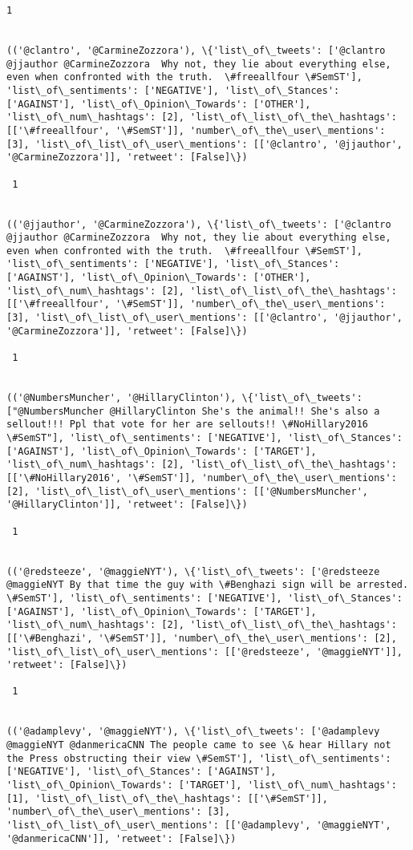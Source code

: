 \documentclass[11pt]{article}
\begin{document}
\begin{Verbatim}[commandchars=\\\{\}]
 1
 

(('@clantro', '@CarmineZozzora'), \{'list\_of\_tweets': ['@clantro @jjauthor @CarmineZozzora  Why not, they lie about everything else, even when confronted with the truth.  \#freeallfour \#SemST'], 'list\_of\_sentiments': ['NEGATIVE'], 'list\_of\_Stances': ['AGAINST'], 'list\_of\_Opinion\_Towards': ['OTHER'], 'list\_of\_num\_hashtags': [2], 'list\_of\_list\_of\_the\_hashtags': [['\#freeallfour', '\#SemST']], 'number\_of\_the\_user\_mentions': [3], 'list\_of\_list\_of\_user\_mentions': [['@clantro', '@jjauthor', '@CarmineZozzora']], 'retweet': [False]\})

 1
 

(('@jjauthor', '@CarmineZozzora'), \{'list\_of\_tweets': ['@clantro @jjauthor @CarmineZozzora  Why not, they lie about everything else, even when confronted with the truth.  \#freeallfour \#SemST'], 'list\_of\_sentiments': ['NEGATIVE'], 'list\_of\_Stances': ['AGAINST'], 'list\_of\_Opinion\_Towards': ['OTHER'], 'list\_of\_num\_hashtags': [2], 'list\_of\_list\_of\_the\_hashtags': [['\#freeallfour', '\#SemST']], 'number\_of\_the\_user\_mentions': [3], 'list\_of\_list\_of\_user\_mentions': [['@clantro', '@jjauthor', '@CarmineZozzora']], 'retweet': [False]\})

 1
 

(('@NumbersMuncher', '@HillaryClinton'), \{'list\_of\_tweets': ["@NumbersMuncher @HillaryClinton She's the animal!! She's also a sellout!!! Ppl that vote for her are sellouts!! \#NoHillary2016 \#SemST"], 'list\_of\_sentiments': ['NEGATIVE'], 'list\_of\_Stances': ['AGAINST'], 'list\_of\_Opinion\_Towards': ['TARGET'], 'list\_of\_num\_hashtags': [2], 'list\_of\_list\_of\_the\_hashtags': [['\#NoHillary2016', '\#SemST']], 'number\_of\_the\_user\_mentions': [2], 'list\_of\_list\_of\_user\_mentions': [['@NumbersMuncher', '@HillaryClinton']], 'retweet': [False]\})

 1
 

(('@redsteeze', '@maggieNYT'), \{'list\_of\_tweets': ['@redsteeze @maggieNYT By that time the guy with \#Benghazi sign will be arrested. \#SemST'], 'list\_of\_sentiments': ['NEGATIVE'], 'list\_of\_Stances': ['AGAINST'], 'list\_of\_Opinion\_Towards': ['TARGET'], 'list\_of\_num\_hashtags': [2], 'list\_of\_list\_of\_the\_hashtags': [['\#Benghazi', '\#SemST']], 'number\_of\_the\_user\_mentions': [2], 'list\_of\_list\_of\_user\_mentions': [['@redsteeze', '@maggieNYT']], 'retweet': [False]\})

 1
 

(('@adamplevy', '@maggieNYT'), \{'list\_of\_tweets': ['@adamplevy @maggieNYT @danmericaCNN The people came to see \& hear Hillary not the Press obstructing their view \#SemST'], 'list\_of\_sentiments': ['NEGATIVE'], 'list\_of\_Stances': ['AGAINST'], 'list\_of\_Opinion\_Towards': ['TARGET'], 'list\_of\_num\_hashtags': [1], 'list\_of\_list\_of\_the\_hashtags': [['\#SemST']], 'number\_of\_the\_user\_mentions': [3], 'list\_of\_list\_of\_user\_mentions': [['@adamplevy', '@maggieNYT', '@danmericaCNN']], 'retweet': [False]\})


\end{Verbatim}
\end{document}
